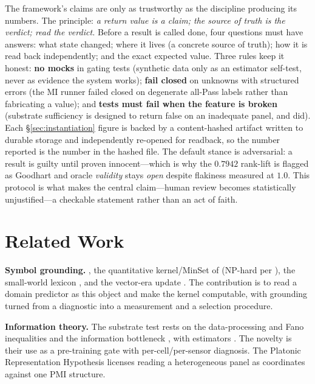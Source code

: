 \documentclass[10pt,twocolumn]{article}
\begin{document}
The framework's claims are only as trustworthy as the discipline producing its
numbers. The principle: \emph{a return value is a claim; the source of truth is
the verdict; read the verdict.} Before a result is called done, four questions
must have answers: what state changed; where it lives (a concrete source of
truth); how it is read back independently; and the exact expected value. Three
rules keep it honest: \textbf{no mocks} in gating tests (synthetic data only as an
estimator self-test, never as evidence the system works); \textbf{fail closed} on
unknowns with structured errors (the MI runner failed closed on degenerate
all-Pass labels rather than fabricating a value); and \textbf{tests must fail when
the feature is broken} (substrate sufficiency is designed to return false on an
inadequate panel, and did). Each \S\ref{sec:instantiation} figure is backed by a
content-hashed artifact written to durable storage and independently re-opened for
readback, so the number reported is the number in the hashed file. The default
stance is adversarial: a result is guilty until proven innocent---which is why the
$0.7942$ rank-lift is flagged as Goodhart and oracle \emph{validity} stays
\emph{open} despite flakiness measured at $1.0$. This protocol is what makes the
central claim---human review becomes statistically unjustified---a checkable
statement rather than an act of faith.

\section{Related Work}
\label{sec:related}

\textbf{Symbol grounding.} \citet{harnad1990symbol}, the quantitative
kernel/MinSet of \citet{vincentlamarre2016latent} (NP-hard
per \citealp{karp1972reducibility}), the small-world lexicon
\citep{steyvers2005largescale}, and the vector-era update
\citep{mollo2023vector}. The contribution is to read a domain predictor as this
object and make the kernel computable, with grounding turned from a diagnostic
into a measurement and a selection procedure.

\textbf{Information theory.} The substrate test rests on the data-processing and
Fano inequalities \citep{cover2006elements, fano1961transmission} and the
information bottleneck \citep{tishby1999information}, with estimators
\citep{belghazi2018mine, vandenoord2018cpc, kraskov2004estimating,
poole2019variational}. The novelty is their use as a pre-training gate with
per-cell/per-sensor diagnosis. The Platonic Representation Hypothesis
\citep{huh2024platonic} licenses reading a heterogeneous panel as coordinates
against one PMI structure.
\end{document}
